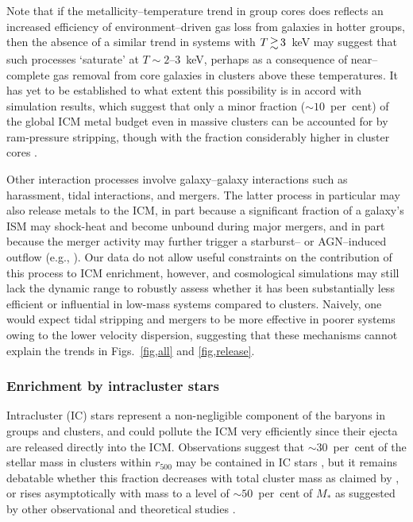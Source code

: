 \documentclass[useAMS,usenatbib]{mn2e}
\begin{document}
Note that if the metallicity--temperature trend in group cores does
reflects an increased efficiency of environment--driven gas loss from
galaxies in hotter groups, then the absence of a similar trend in
systems with $T\ga 3$~keV \citep{degr04} may suggest that such
processes `saturate' at $T\sim 2$--3~keV, perhaps as a consequence of
near--complete gas removal from core galaxies in clusters above these
temperatures. It has yet to be established to what extent this
possibility is in accord with simulation results, which suggest that
only a minor fraction ($\sim 10$~per~cent) of the global ICM metal
budget even in massive clusters can be accounted for by ram-pressure
stripping, though with the fraction considerably higher in cluster
cores \citep{doma06, kapf07}.



Other interaction processes involve galaxy--galaxy interactions such
as harassment, tidal interactions, and mergers. The latter process in
particular may also release metals to the ICM, in part because a
significant fraction of a galaxy's ISM may shock-heat and become
unbound during major mergers, and in part because the merger activity
may further trigger a starburst-- or AGN--induced outflow (e.g.,
\citealt{cox06,hopk06}). Our data do not allow useful constraints on
the contribution of this process to ICM enrichment, however, and
cosmological simulations may still lack the dynamic range to robustly
assess whether it has been substantially less efficient or influential
in low-mass systems compared to clusters. Naively, one would expect
tidal stripping and mergers to be more effective in poorer systems
owing to the lower velocity dispersion, suggesting that these
mechanisms cannot explain the trends in Figs.~\ref{fig,all} and
\ref{fig,release}.




\subsubsection{Enrichment by intracluster stars}

Intracluster (IC) stars represent a non-negligible component of the
baryons in groups and clusters, and could pollute the ICM very
efficiently since their ejecta are released directly into the
ICM. Observations suggest that $\sim 30$~per~cent of the stellar mass
in clusters within $r_{500}$ may be contained in IC stars
\citep{gonz07}, but it remains debatable whether this fraction
decreases with total cluster mass as claimed by \citet{gonz07}, or
rises asymptotically with mass to a level of $\sim 50$~per~cent of
$M_{\ast}$ as suggested by other observational and theoretical studies
\citep*{lin04,conr07,purc07}. 
\end{document}
